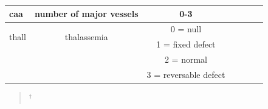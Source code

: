 \documentclass[10pt,journal]{IEEEtran}
\begin{document}
\begin{table}[th]
{\begin{tabular}{p{1.2cm} c c c p{2cm} c c }
caa & number of major vessels &  0-3 \\\hline




\multirow{2}{2cm}{thall } & \multirow{2}{2cm}{thalassemia} & 0 = null \\ & & 1 = fixed defect \\ & & 2 = normal \\ & & 3 = reversable defect\\\hline



\bottomrule
\end{tabular}%
}
\begin{quote}
\scriptsize
\centering
$^{\dagger}$ 
\end{quote}
\end{table}

 

\ifCLASSOPTIONcaptionsoff
  \newpage
\fi







\nocite{articlePredictingFuzzyCMeans}
\nocite{articlePredictingFuzzyCMeans}
\nocite{inbookClusteringAndAsociationRules}
\nocite{fusterbarcel_2023_unleashing}
\nocite{emmanuelramos143FeatureSelection}
\nocite{stephenallwright_2022}

%

\end{document}
